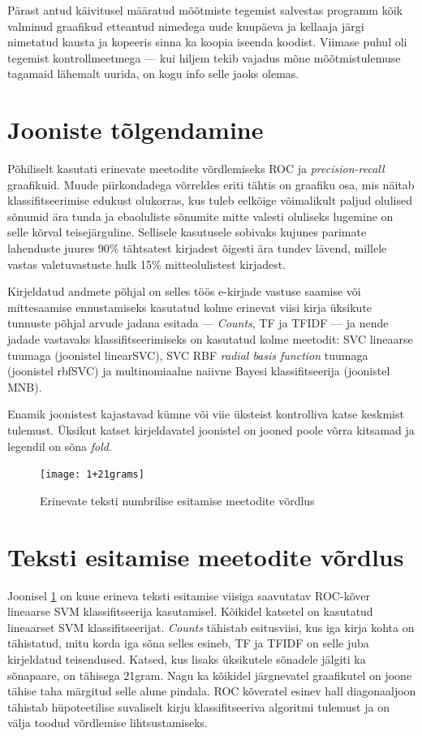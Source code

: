 \documentclass[]{trkuur}
\let\eng\emph
\begin{document}
Pärast antud käivitusel määratud mõõtmiste tegemist salvestas programm kõik
valminud graafikud etteantud nimedega uude kuupäeva ja kellaaja järgi nimetatud
kausta ja kopeeris sinna ka koopia iseenda koodist. Viimase puhul oli tegemist
kontrollmeetmega --- kui hiljem tekib vajadus mõne mõõtmistulemuse
tagamaid lähemalt uurida, on kogu info selle jaoks olemas.

\section{Jooniste tõlgendamine}
Põhiliselt kasutati erinevate meetodite võrdlemiseks ROC ja \eng{precision-recall}
graafikuid. Muude piirkondadega võrreldes eriti tähtis on graafiku osa, mis
näitab klassifitseerimise edukust olukorras, kus tuleb eelkõige võimalikult
paljud olulised sõnumid ära tunda ja ebaoluliste sõnumite mitte valesti
oluliseks lugemine on selle kõrval teisejärguline. Sellisele kasutusele sobivaks
kujunes parimate lahenduste juures 90\% tähtsatest kirjadest õigesti ära tundev lävend,
millele vastas valetuvastuste hulk 15\% mitteolulistest kirjadest.

Kirjeldatud andmete põhjal on selles töös e-kirjade vastuse saamise või
mittesaamise ennustamiseks kasutatud kolme erinevat viisi kirja üksikute
tunnuste põhjal arvude jadana esitada --- \eng{Counts}, TF ja TFIDF ---
ja nende jadade vastavaks klassifitseerimiseks on kasutatud kolme meetodit:
SVC lineaarse tuumaga (joonistel linearSVC), SVC RBF \eng{radial
basis function} tuumaga (joonistel rbfSVC) ja
multinomiaalne naiivne Bayesi klassifitseerija (joonistel MNB).

Enamik joonistest
kajastavad kümne või viie üksteist kontrolliva katse keskmist tulemust. Üksikut katset kirjeldavatel joonistel on jooned poole võrra kitsamad ja legendil on sõna \eng{fold}.

\begin{figure}[ht]
\texttt{[image: 1+21grams]}
\caption{Erinevate teksti numbrilise esitamise meetodite võrdlus}
\label{textvect21}
\end{figure}

\section{Teksti esitamise meetodite võrdlus}
Joonisel \ref{textvect21} on kuue erineva teksti esitamise viisiga saavutatav ROC-kõver lineaarse SVM klassifitseerija kasutamisel.
Kõikidel katsetel on kasutatud lineaarset SVM klassifitseerijat.
\eng{Counts} tähistab esitusviisi, kus iga kirja kohta on tähistatud, mitu korda iga
sõna selles esineb, TF ja TFIDF on selle juba kirjeldatud teisendused.
Katsed, kus lisaks üksikutele sõnadele jälgiti ka sõnapaare, on tähisega 21gram.
Nagu ka kõikidel järgnevatel graafikutel on joone tähise taha märgitud selle
alune pindala. ROC kõveratel esinev hall diagonaaljoon tähistab hüpoteetilise
suvaliselt kirju klassifitseeriva algoritmi tulemust ja on välja toodud
võrdlemise lihtsustamiseks.
\end{document}
